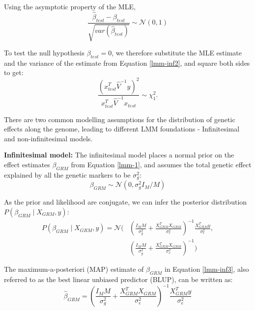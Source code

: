 %
Using the asymptotic property of the MLE, 
\begin{equation}
   \frac{\hat{\beta}_{test} - \beta_{test}}{\sqrt{var(\hat{\beta}_{test})}} \sim \mathcal{N}(0, 1) 
\end{equation}

%
To test the null hypothesis $\beta_{test} = 0$, we therefore substitute the MLE estimate and the variance of the estimate from Equation \ref{lmm-inf2}, and square both sides to get:
\begin{equation}
   \frac{(x_{test}^T \hat{V}^{-1} y)^2}{x_{test}^T \hat{V}^{-1} x_{test}} \sim \chi^2_1 \label{lmm-chi2-rep}.
\end{equation}


There are two common modelling assumptions for the distribution of genetic effects along the genome, leading to different LMM foundations - Infinitesimal and non-infinitesimal models. 

%
\textbf{Infinitesimal model: }
%
The infinitesimal model places a normal prior on the effect estimates $\beta_{GRM}$ from Equation \ref{lmm-1}, and assumes the total genetic effect explained by all the genetic markers to be $\sigma_g^2$:
\begin{equation}
    \beta_{GRM} \sim \mathcal{N}(0, \sigma_g^2 I_M/M)
\end{equation}

%
As the prior and likelihood are conjugate, we can infer the posterior distribution $P(\beta_{GRM} \mid X_{GRM}, y)$:
\begin{equation}
    \begin{split}
        P(\beta_{GRM} \mid X_{GRM}, y) = \mathcal{N}\Bigg( &\left( \frac{I_M M}{\sigma_g^2} + \frac{X_{GRM}^T X_{GRM}}{\sigma_e^2} \right) ^{-1} \frac{X_{GRM}^T y}{\sigma_e^2}, \\
        &\left( \frac{I_M M}{\sigma_g^2} + \frac{X_{GRM}^T X_{GRM}}{\sigma_e^2} \right) ^{-1} \Bigg) \label{lmm-inf3}
    \end{split}
\end{equation}

%
The maximum-a-posteriori (MAP) estimate of $\beta_{GRM}$ in Equation \ref{lmm-inf3}, also referred to as the best linear unbiased predictor (BLUP), can be written as:
\begin{equation}
    \hat{\beta}_{GRM} = \left( \frac{I_M M}{\sigma_g^2} + \frac{X_{GRM}^T X_{GRM}}{\sigma_e^2} \right) ^{-1} \frac{X_{GRM}^T y}{\sigma_e^2} 
\end{equation}

